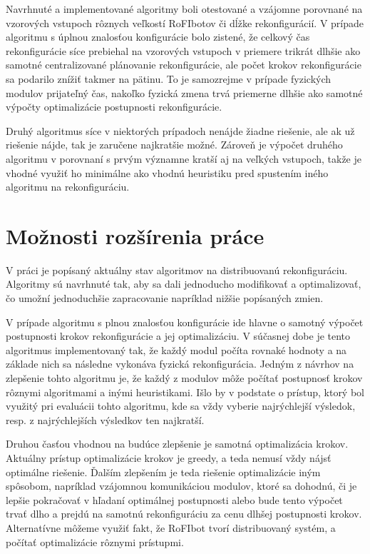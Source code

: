\documentclass[
  printed, %
  oneside, %
  notable,   %
  nolof,     %
  nolot,     %
]{fithesis3}
\begin{document}
Navrhnuté a implementované algoritmy boli otestované a vzájomne porovnané na vzorových vstupoch rôznych veľkostí RoFIbotov či dĺžke rekonfigurácií. V prípade algoritmu s úplnou znalosťou konfigurácie bolo zistené, že celkový čas rekonfigurácie síce prebiehal na vzorových vstupoch v priemere trikrát dlhšie ako samotné centralizované plánovanie rekonfigurácie, ale počet krokov rekonfigurácie sa podarilo znížiť takmer na pätinu. To je samozrejme v prípade fyzických modulov prijateľný čas, nakoľko fyzická zmena trvá priemerne dlhšie ako samotné výpočty optimalizácie postupnosti rekonfigurácie. 

Druhý algoritmus síce v niektorých prípadoch nenájde žiadne riešenie, ale ak už riešenie nájde, tak je zaručene najkratšie možné. Zároveň je výpočet druhého algoritmu v porovnaní s prvým významne kratší aj na veľkých vstupoch, takže je vhodné využiť ho minimálne ako vhodnú heuristiku pred spustením iného algoritmu na rekonfiguráciu. 

\section{Možnosti rozšírenia práce}
\label{sec:future}
V práci je popísaný aktuálny stav algoritmov na distribuovanú rekonfiguráciu. Algoritmy sú navrhnuté tak, aby sa dali jednoducho modifikovať a optimalizovať, čo umožní jednoduchšie zapracovanie napríklad nižšie popísaných zmien. 

V prípade algoritmu s plnou znalosťou konfigurácie ide hlavne o samotný výpočet postupnosti krokov rekonfigurácie a jej optimalizáciu. V súčasnej dobe je tento algoritmus implementovaný tak, že každý modul počíta rovnaké hodnoty a na základe nich sa následne vykonáva fyzická rekonfigurácia. Jedným z návrhov na zlepšenie tohto algoritmu je, že každý z modulov môže počítať postupnosť krokov rôznymi algoritmami a inými heuristikami. Išlo by v podstate o prístup, ktorý bol využitý pri evaluácii tohto algoritmu, kde sa vždy vyberie najrýchlejší výsledok, resp. z najrýchlejších výsledkov ten najkratší. 

Druhou časťou vhodnou na budúce zlepšenie je samotná optimalizácia krokov. Aktuálny prístup optimalizácie krokov je greedy, a teda nemusí vždy nájsť optimálne riešenie. Ďalším zlepšením je teda riešenie optimalizácie iným spôsobom, napríklad vzájomnou komunikáciou modulov, ktoré sa dohodnú, či je lepšie pokračovať v hľadaní optimálnej postupnosti alebo bude tento výpočet trvať dlho a prejdú na samotnú rekonfiguráciu za cenu dlhšej postupnosti krokov. Alternatívne môžeme využiť fakt, že RoFIbot tvorí distribuovaný systém, a počítať optimalizácie rôznymi prístupmi. 
\end{document}
